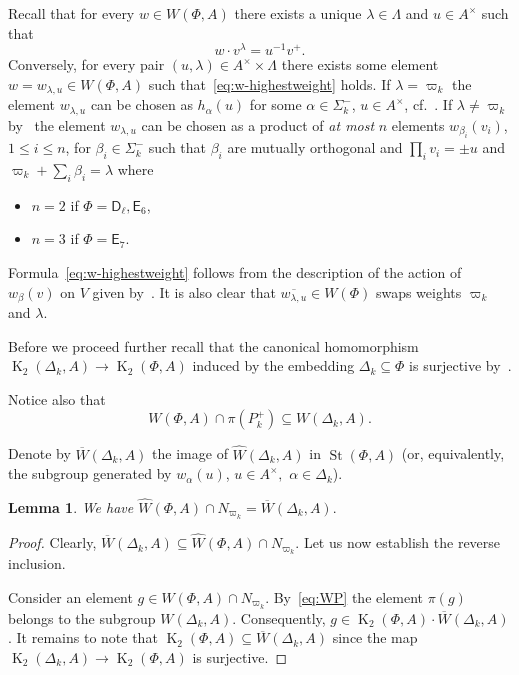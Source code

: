 \documentclass[oneside, 10pt]{amsart}
\DeclareMathOperator{\St}{St}
\DeclareMathOperator{\K}{K}
\newcommand{\rD}{\mathsf{D}}
\newcommand{\rE}{\mathsf{E}}
\newcommand{\StW}{\widehat{W}}
\numberwithin{equation}{section}
\numberwithin{thm}{section}
\newtheorem{lemma}[thm]{Lemma}
\numberwithin{lemma}{section}
\theoremstyle{definition}
\theoremstyle{remark}
\begin{document}
Recall that for every $w \in W(\Phi, A)$ there exists a unique $\lambda \in \Lambda$ and $u \in A^\times $ such that
\begin{equation}\label{eq:w-highestweight} w \cdot v^\lambda = u^{-1} v^+. \end{equation}
Conversely, for every pair $(u, \lambda) \in A^\times \times \Lambda$ there exists some element $w = w_{\lambda, u} \in W(\Phi, A)$ such that~\eqref{eq:w-highestweight} holds.
If $\lambda = \varpi_k$ the element $w_{\lambda, u}$ can be chosen as $h_\alpha(u)$ for some $\alpha \in \Sigma_k^-$, $u \in A^\times$, cf.~\cite[Lemma~7]{V00}.
If $\lambda \neq \varpi_k$ by~\cite[Lemma~6]{V00} the element $w_{\lambda, u}$ can be chosen as a product of \textit{at most} $n$ elements
$w_{\beta_i}(v_i)$, $1 \leq i \leq n$, for $\beta_i\in\Sigma_k^-$ such that $\beta_i$ are mutually orthogonal and $\prod_i v_i = \pm u$ and $\varpi_k + \sum_i \beta_i = \lambda$ where
\begin{itemize}
\item $n=2$ if $\Phi = \rD_\ell, \rE_6$,
\item $n=3$ if $\Phi = \rE_7$.
\end{itemize}
Formula~\eqref{eq:w-highestweight} follows from the description of the action of $w_\beta(v)$ on $V$ given by~\cite[Lemma~6]{V00}.
It is also clear that $\overline{w_{\lambda, u}} \in W(\Phi)$ swaps weights $\varpi_k$ and $\lambda$.

Before we proceed further recall that the canonical homomorphism
$\K_2(\Delta_k, A) \to \K_2(\Phi, A)$ induced by the embedding $\Delta_k \subseteq \Phi$ is surjective by~\cite[Theorem~2.13]{Ste73}.

Notice also that
\begin{equation} \label{eq:WP} W(\Phi, A) \cap \pi(P_k^+) \subseteq W(\Delta_k, A). \end{equation}

Denote by $\overline{W}(\Delta_k, A)$ the image of $\StW(\Delta_k, A)$ in $\St(\Phi, A)$ (or, equivalently, the subgroup generated by $w_\alpha(u)$, $u\in A^\times,$ $\alpha \in \Delta_k$).
\begin{lemma} \label{lem:can-repr1}
We have $\StW(\Phi, A) \cap N_{\varpi_k} = \overline{W}(\Delta_k, A).$
\end{lemma}
\begin{proof}
Clearly, $\overline{W}(\Delta_k, A) \subseteq \StW(\Phi, A) \cap N_{\varpi_k}$.
Let us now establish the reverse inclusion.

Consider an element $g \in \StW(\Phi, A) \cap N_{\varpi_k}$.
By~\eqref{eq:WP} the element $\pi(g)$ belongs to the subgroup $W(\Delta_k, A)$.
Consequently, $g \in \K_2(\Phi, A) \cdot \overline{W}(\Delta_k, A)$.
It remains to note that $\K_2(\Phi, A) \subseteq \overline{W}(\Delta_k, A)$ since the map $\K_2(\Delta_k, A) \to \K_2(\Phi, A)$ is surjective.
\end{proof}
\end{document}
